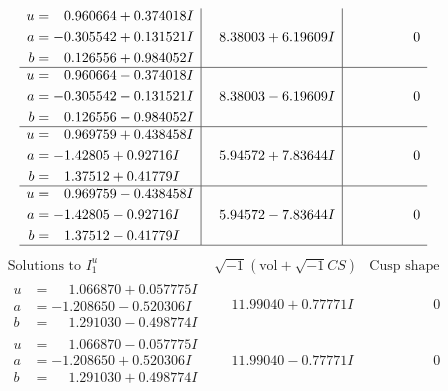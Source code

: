 \documentclass[1p]{elsarticle_modified}
\theoremstyle{definition}
\newcommand{\I}{\sqrt{-1}}
\begin{document}
$$\begin{array}{c|c|c}
\begin{aligned}
u &= \phantom{-}0.960664 + 0.374018 I \\
a &= -0.305542 + 0.131521 I \\
b &= \phantom{-}0.126556 + 0.984052 I\end{aligned}
 & \phantom{-}8.38003 + 6.19609 I & \phantom{-0.000000 } 0 \\ \hline\begin{aligned}
u &= \phantom{-}0.960664 - 0.374018 I \\
a &= -0.305542 - 0.131521 I \\
b &= \phantom{-}0.126556 - 0.984052 I\end{aligned}
 & \phantom{-}8.38003 - 6.19609 I & \phantom{-0.000000 } 0 \\ \hline\begin{aligned}
u &= \phantom{-}0.969759 + 0.438458 I \\
a &= -1.42805 + 0.92716 I \\
b &= \phantom{-}1.37512 + 0.41779 I\end{aligned}
 & \phantom{-}5.94572 + 7.83644 I & \phantom{-0.000000 } 0 \\ \hline\begin{aligned}
u &= \phantom{-}0.969759 - 0.438458 I \\
a &= -1.42805 - 0.92716 I \\
b &= \phantom{-}1.37512 - 0.41779 I\end{aligned}
 & \phantom{-}5.94572 - 7.83644 I & \phantom{-0.000000 } 0\\
 \hline 
 \end{array}$$\newpage$$\begin{array}{c|c|c}  
\text{Solutions to }I^u_{1}& \I (\text{vol} + \sqrt{-1}CS) & \text{Cusp shape}\\
 \hline 
\begin{aligned}
u &= \phantom{-}1.066870 + 0.057775 I \\
a &= -1.208650 - 0.520306 I \\
b &= \phantom{-}1.291030 - 0.498774 I\end{aligned}
 & \phantom{-}11.99040 + 0.77771 I & \phantom{-0.000000 } 0 \\ \hline\begin{aligned}
u &= \phantom{-}1.066870 - 0.057775 I \\
a &= -1.208650 + 0.520306 I \\
b &= \phantom{-}1.291030 + 0.498774 I\end{aligned}
 & \phantom{-}11.99040 - 0.77771 I & \phantom{-0.000000 } 0 \\ \hline\begin{aligned}

\end{aligned}
\end{array}$$
\end{document}
